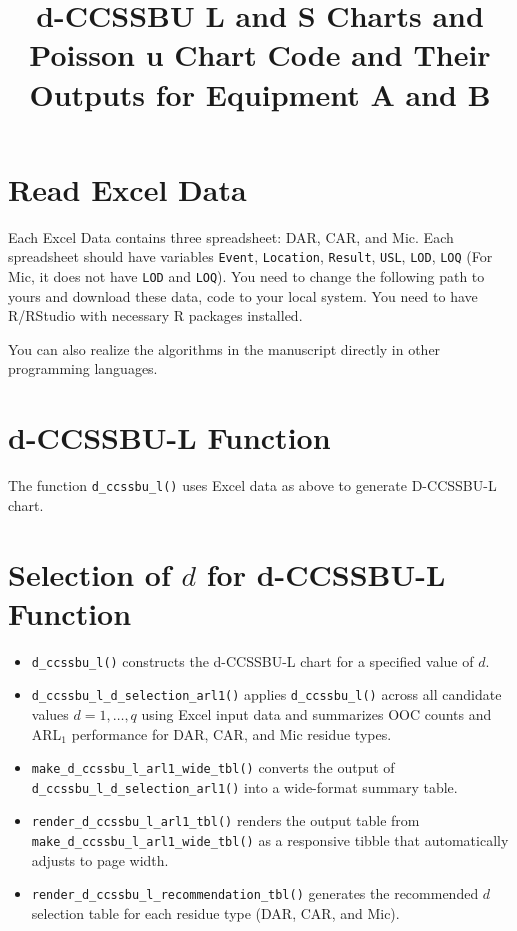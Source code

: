 \documentclass[
  12pt,
  letterpaper,
  DIV=11,
  numbers=noendperiod]{scrartcl}
\title{d-CCSSBU L and S Charts and Poisson u Chart Code and Their
Outputs for Equipment A and B}
\author{}
\date{}
\begin{document}
\maketitle



\section{Read Excel Data}\label{read-excel-data}

Each Excel Data contains three spreadsheet: DAR, CAR, and Mic. Each
spreadsheet should have variables \texttt{Event}, \texttt{Location},
\texttt{Result}, \texttt{USL}, \texttt{LOD}, \texttt{LOQ} (For Mic, it
does not have \texttt{LOD} and \texttt{LOQ}). You need to change the
following path to yours and download these data, code to your local
system. You need to have R/RStudio with necessary R packages installed.

You can also realize the algorithms in the manuscript directly in other
programming languages.

\section{d-CCSSBU-L Function}\label{d-ccssbu-l-function}

The function \texttt{d\_ccssbu\_l()} uses Excel data as above to
generate D-CCSSBU-L chart.

\section{\texorpdfstring{Selection of \(d\) for d-CCSSBU-L
Function}{Selection of d for d-CCSSBU-L Function}}\label{selection-of-d-for-d-ccssbu-l-function}

\begin{itemize}
\item
  \texttt{d\_ccssbu\_l()} constructs the d-CCSSBU-L chart for a
  specified value of \(d\).
\item
  \texttt{d\_ccssbu\_l\_d\_selection\_arl1()} applies
  \texttt{d\_ccssbu\_l()} across all candidate values \(d=1,\ldots,q\)
  using Excel input data and summarizes OOC counts and ARL\(_1\)
  performance for DAR, CAR, and Mic residue types.
\item
  \texttt{make\_d\_ccssbu\_l\_arl1\_wide\_tbl()} converts the output of
  \texttt{d\_ccssbu\_l\_d\_selection\_arl1()} into a wide-format summary
  table.
\item
  \texttt{render\_d\_ccssbu\_l\_arl1\_tbl()} renders the output table
  from \texttt{make\_d\_ccssbu\_l\_arl1\_wide\_tbl()} as a responsive
  tibble that automatically adjusts to page width.
\item
  \texttt{render\_d\_ccssbu\_l\_recommendation\_tbl()} generates the
  recommended \(d\) selection table for each residue type (DAR, CAR, and
  Mic).
\end{itemize}
\end{document}
